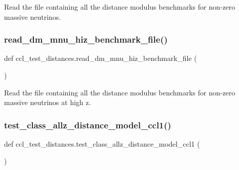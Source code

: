 \begin{DoxyVerb}Read the file containing all the distance modulus benchmarks
for non-zero massive neutrinos.
\end{DoxyVerb}
 \mbox{\label{namespaceccl__test__distances_aa10a822700be058619a7391bdbc433d5}} 
\subsubsection{\texorpdfstring{read\+\_\+dm\+\_\+mnu\+\_\+hiz\+\_\+benchmark\+\_\+file()}{read\_dm\_mnu\_hiz\_benchmark\_file()}}
{\footnotesize\ttfamily def ccl\+\_\+test\+\_\+distances.\+read\+\_\+dm\+\_\+mnu\+\_\+hiz\+\_\+benchmark\+\_\+file (\begin{DoxyParamCaption}{ }\end{DoxyParamCaption})}

\begin{DoxyVerb}Read the file containing all the distance modulus benchmarks
for non-zero massive neutrinos at high z.
\end{DoxyVerb}
 \mbox{\label{namespaceccl__test__distances_a419f62a40098f2bbccbf6c5efe53dc8f}} 
\subsubsection{\texorpdfstring{test\+\_\+class\+\_\+allz\+\_\+distance\+\_\+model\+\_\+ccl1()}{test\_class\_allz\_distance\_model\_ccl1()}}
{\footnotesize\ttfamily def ccl\+\_\+test\+\_\+distances.\+test\+\_\+class\+\_\+allz\+\_\+distance\+\_\+model\+\_\+ccl1 (\begin{DoxyParamCaption}{ }\end{DoxyParamCaption})}

